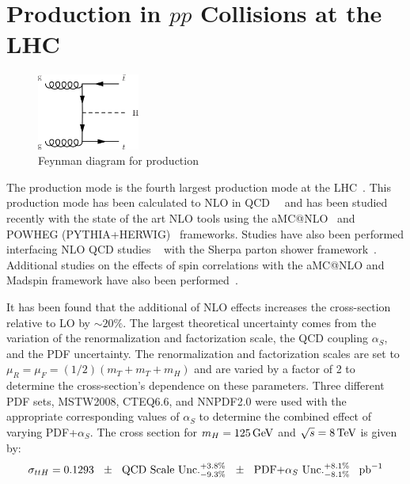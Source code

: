 \section{\ttH Production in $pp$ Collisions at the LHC}
\label{ttH_production_overview}

\begin{figure}[h]
   \centering
  \includegraphics[width=0.3\textwidth]{Figures/Feynman_Diagrams/higgs_production__ttH.pdf}
  \caption{Feynman diagram for \ttH production} \label{fd:ttH_simple}
\end{figure}

\par The \ttH production mode is the fourth largest production mode at
the LHC~\cite{th:HiggsXS_2013}.  This production mode has been
calculated to NLO in
QCD~\cite{tthXS_NLO_BeenakkerEtAl_1}~\cite{tthXS_NLO_BeenakkerEtAl_2}
and has been studied recently with the state of the art NLO tools
using the aMC@NLO~\cite{tthXS_aMCatNLO_Frederix} and POWHEG
(PYTHIA+HERWIG)~\cite{tthXS_powheg_Garzelli} frameworks. Studies have
also been performed interfacing NLO QCD studies
~\cite{tthXS_NLO_Dawson} with the Sherpa parton shower
framework~\cite{tthXS_sherpa_Gleisberg}.  Additional studies on the
effects of spin correlations with the aMC@NLO and Madspin framework
have also been performed~\cite{tthXS_aMCatNLO_madspin_Artoisenet}.  

\par  It has been found that the additional of NLO effects increases
the cross-section relative to LO by $\sim20\%$.  The largest
theoretical uncertainty comes from the variation of the
renormalization and factorization scale, the QCD coupling $\alpha_{S}$,
and the PDF uncertainty.  The renormalization and factorization scales
are set to $\mu_{R} = \mu_{F} = (1/2)(m_{T} + m_{T} + m_{H})$ and are
varied by a factor of 2 to determine the cross-section's dependence on
these parameters.  Three different PDF sets,  MSTW2008, CTEQ6.6, and
NNPDF2.0 were used with the appropriate corresponding values of
$\alpha_{S}$ to determine the combined effect of varying
PDF+$\alpha_{S}$.  The cross section for $m_{H} = 125\,\text{Ge\hspace{-.08em}V}$ and
$\sqrt{s}=8\,\text{Te\hspace{-.08em}V}$ is given by:
\begin{equation}\label{eq:tth_xs}
\sigma_{ttH} = 0.1293~~\pm \text{~~QCD Scale Unc.}^{+3.8\%}_{-9.3\%}~~\pm
\text{~~PDF+$\alpha_{S}$ Unc.}^{+8.1\%}_{-8.1\%}~~\mbox{\ensuremath{\,\text{pb}^\text{$-$1}}}
\end{equation}

